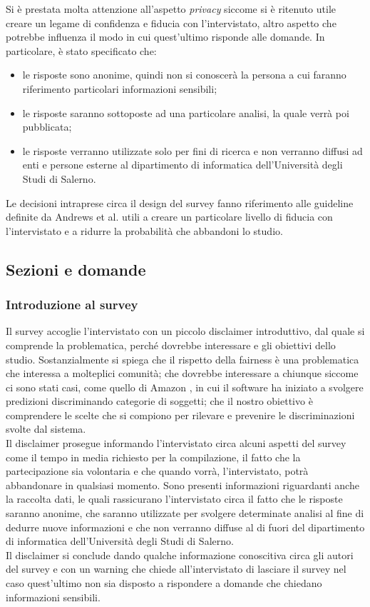 Si è prestata molta attenzione all'aspetto \emph{privacy} siccome si è ritenuto utile creare un legame di confidenza e fiducia con l'intervistato, altro aspetto che potrebbe influenza il modo in cui quest'ultimo risponde alle domande. In particolare, è stato specificato che:
\begin{itemize}
    \item le risposte sono anonime, quindi non si conoscerà la persona a cui faranno riferimento particolari informazioni sensibili;
    \item le risposte saranno sottoposte ad una particolare analisi, la quale verrà poi pubblicata;
    \item le risposte verranno utilizzate solo per fini di ricerca e non verranno diffusi ad enti e persone esterne al dipartimento di informatica dell'Università degli Studi di Salerno.
\end{itemize}
Le decisioni intraprese circa il design del survey fanno riferimento alle guideline definite da Andrews et al. \cite{andrews2007conducting} utili a creare un particolare livello di fiducia con l'intervistato e a ridurre la probabilità che abbandoni lo studio.

\subsection{Sezioni e domande}
\subsubsection{Introduzione al survey}

Il survey accoglie l'intervistato con un piccolo disclaimer introduttivo, dal quale si comprende la problematica, perché dovrebbe interessare e gli obiettivi dello studio.
Sostanzialmente si spiega che il rispetto della fairness è una problematica che interessa a molteplici comunità; che dovrebbe interessare a chiunque siccome ci sono stati casi, come quello di Amazon \cite{amazonrecruiting2018reuters}, in cui il software ha iniziato a svolgere predizioni discriminando categorie di soggetti; che il nostro obiettivo è comprendere le scelte che si compiono per rilevare e prevenire le discriminazioni svolte dal sistema.\\
Il disclaimer prosegue informando l'intervistato circa alcuni aspetti del survey come il tempo in media richiesto per la compilazione, il fatto che la partecipazione sia volontaria e che quando vorrà, l'intervistato, potrà abbandonare in qualsiasi momento. Sono presenti informazioni riguardanti anche la raccolta dati, le quali rassicurano l'intervistato circa il fatto che le risposte saranno anonime, che saranno utilizzate per svolgere determinate analisi al fine di dedurre nuove informazioni e che non verranno diffuse al di fuori del dipartimento di informatica dell'Università degli Studi di Salerno.\\
Il disclaimer si conclude dando qualche informazione conoscitiva circa gli autori del survey e con un warning che chiede all'intervistato di lasciare il survey nel caso quest'ultimo non sia disposto a rispondere a domande che chiedano informazioni sensibili.

